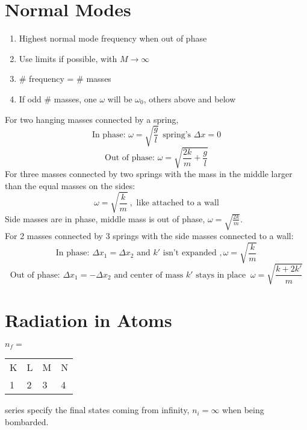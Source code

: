 \documentclass[10pt,letter]{article}
\begin{document}
\section{Normal Modes} %
\label{sec:normal_modes}
\begin{enumerate}
    \item Highest normal mode frequency when out of phase
    \item Use limits if possible, with $M \rightarrow \infty$
    \item \# frequency = \# masses
    \item If odd \# masses, one $\omega$ will be $\omega_0$, others above and below
\end{enumerate}
For two hanging masses connected by a spring, 
\begin{equation}
    \textrm{In phase: }\omega = \sqrt{\frac{g}{l}}~~ \textrm{spring's }\Delta x = 0
\end{equation}
\begin{equation}
    \textrm{Out of phase: } \omega = \sqrt{ \frac{2k}{m} + \frac{g}{l}}
\end{equation}
For three masses connected by two springs with the mass in the middle larger than the equal masses on the sides:
\begin{equation}
    \omega = \sqrt{ \frac{k}{m}}~, \textrm{ like attached to a wall}
\end{equation}
Side masses are in phase, middle mass is out of phase, $\omega = \sqrt{\frac{2k}{m}}$.\\

For 2 masses connected by 3 springs with the side masses connected to a wall:
\begin{equation}
    \textrm{In phase: } \Delta x_1 = \Delta x_2 \textrm{ and }k' \textrm{ isn't expanded }, \omega = \sqrt{\frac{k}{m}}
\end{equation}
\begin{equation}
    \textrm{Out of phase: } \Delta x_1 = -\Delta x_2 \textrm{ and center of mass } k' \textrm{ stays in place }~ \omega = \sqrt{\frac{k + 2k'}{m}}
\end{equation}

\section{Radiation in Atoms} %
\label{sec:radiation_in_atoms}
$n_f=$\begin{tabular}{l l l l}
K & L & M & N\\
1 & 2 & 3 & 4
\end{tabular}
series specify the final states coming from infinity, $n_i = \infty$ when being bombarded. 
\end{document}
